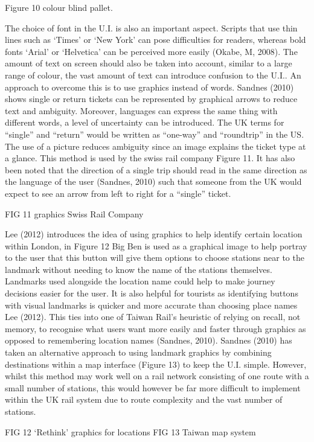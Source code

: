 Figure 10 colour blind pallet.

The choice of font in the U.I. is also an important aspect. Scripts that use thin lines such as ‘Times’ or ‘New York’ can pose difficulties for readers, whereas bold fonts ‘Arial’ or ‘Helvetica’ can be perceived more easily (Okabe, M, 2008). The amount of text on screen should also be taken into account, similar to a large range of colour, the vast amount of text can introduce confusion to the U.I.. An approach to overcome this is to use graphics instead of words. Sandnes (2010) shows single or return tickets can be represented by graphical arrows to reduce text and ambiguity. Moreover, languages can express the same thing with different words, a level of uncertainty can be introduced. The UK terms for “single” and “return” would be written as  “one-way” and “roundtrip” in the US. The use of a picture reduces ambiguity since an image explains the ticket type at a glance. This method is used by the swiss rail company Figure 11. It has also been noted that the direction of a single trip should read in the same direction as the language of the user (Sandnes, 2010) such that someone from the UK would expect to see an arrow from left to right for a “single” ticket.


FIG 11 graphics Swiss Rail Company


Lee (2012) introduces the idea of using graphics to help identify certain location within London, in Figure 12 Big Ben is used as a graphical image to help portray to the user that this button will give them options to choose stations near to the landmark without needing to know the name of the stations themselves. Landmarks used alongside the location name could help to make journey decisions easier for the user. It is also helpful for tourists as identifying buttons with visual landmarks is quicker and more accurate than choosing place names Lee (2012). This ties into one of Taiwan Rail’s heuristic of relying on recall, not memory, to recognise what users want more easily and faster through graphics as opposed to remembering location names (Sandnes, 2010). Sandnes (2010) has taken an alternative approach to using landmark graphics by combining destinations within a map interface (Figure 13) to keep the U.I. simple. However, whilst this method may work well on a rail network consisting of one route with a small number of stations, this would however be far more difficult to implement within the UK rail system due to route complexity and the vast number of stations.


FIG 12 ‘Rethink’ graphics for locations		FIG 13 Taiwan map system


